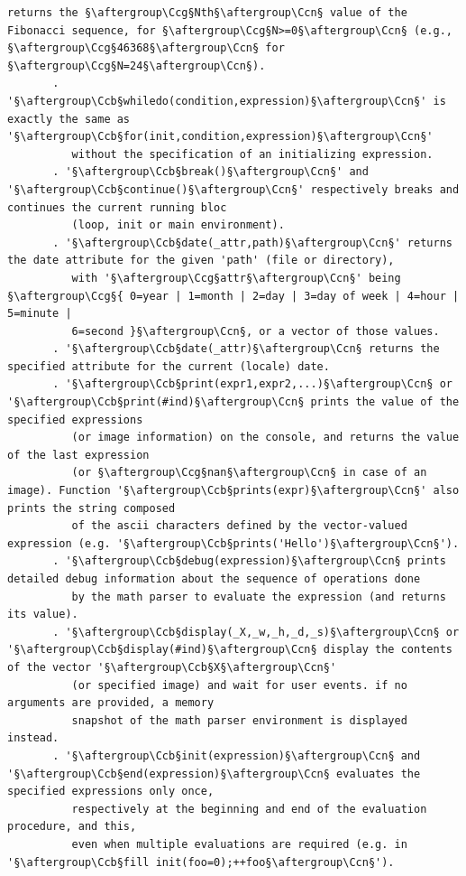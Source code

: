 \documentclass[a4paper,10.5pt,twoside]{book}
\def\Ccb{\color{cb}}
\def\Ccg{\color{cc}}
\def\Ccn{\color{black}}
\begin{document}
\begin{lstlisting}[escapechar=§]
          returns the §\aftergroup\Ccg§Nth§\aftergroup\Ccn§ value of the Fibonacci sequence, for §\aftergroup\Ccg§N>=0§\aftergroup\Ccn§ (e.g., §\aftergroup\Ccg§46368§\aftergroup\Ccn§ for §\aftergroup\Ccg§N=24§\aftergroup\Ccn§). 
       . '§\aftergroup\Ccb§whiledo(condition,expression)§\aftergroup\Ccn§' is exactly the same as '§\aftergroup\Ccb§for(init,condition,expression)§\aftergroup\Ccn§' 
          without the specification of an initializing expression. 
       . '§\aftergroup\Ccb§break()§\aftergroup\Ccn§' and '§\aftergroup\Ccb§continue()§\aftergroup\Ccn§' respectively breaks and continues the current running bloc 
          (loop, init or main environment). 
       . '§\aftergroup\Ccb§date(_attr,path)§\aftergroup\Ccn§' returns the date attribute for the given 'path' (file or directory), 
          with '§\aftergroup\Ccg§attr§\aftergroup\Ccn§' being §\aftergroup\Ccg§{ 0=year | 1=month | 2=day | 3=day of week | 4=hour | 5=minute | 
          6=second }§\aftergroup\Ccn§, or a vector of those values. 
       . '§\aftergroup\Ccb§date(_attr)§\aftergroup\Ccn§ returns the specified attribute for the current (locale) date. 
       . '§\aftergroup\Ccb§print(expr1,expr2,...)§\aftergroup\Ccn§ or '§\aftergroup\Ccb§print(#ind)§\aftergroup\Ccn§ prints the value of the specified expressions 
          (or image information) on the console, and returns the value of the last expression 
          (or §\aftergroup\Ccg§nan§\aftergroup\Ccn§ in case of an image). Function '§\aftergroup\Ccb§prints(expr)§\aftergroup\Ccn§' also prints the string composed 
          of the ascii characters defined by the vector-valued expression (e.g. '§\aftergroup\Ccb§prints('Hello')§\aftergroup\Ccn§'). 
       . '§\aftergroup\Ccb§debug(expression)§\aftergroup\Ccn§ prints detailed debug information about the sequence of operations done 
          by the math parser to evaluate the expression (and returns its value). 
       . '§\aftergroup\Ccb§display(_X,_w,_h,_d,_s)§\aftergroup\Ccn§ or '§\aftergroup\Ccb§display(#ind)§\aftergroup\Ccn§ display the contents of the vector '§\aftergroup\Ccb§X§\aftergroup\Ccn§' 
          (or specified image) and wait for user events. if no arguments are provided, a memory 
          snapshot of the math parser environment is displayed instead. 
       . '§\aftergroup\Ccb§init(expression)§\aftergroup\Ccn§ and '§\aftergroup\Ccb§end(expression)§\aftergroup\Ccn§ evaluates the specified expressions only once, 
          respectively at the beginning and end of the evaluation procedure, and this, 
          even when multiple evaluations are required (e.g. in '§\aftergroup\Ccb§fill init(foo=0);++foo§\aftergroup\Ccn§'). 

\end{lstlisting}
\end{document}
